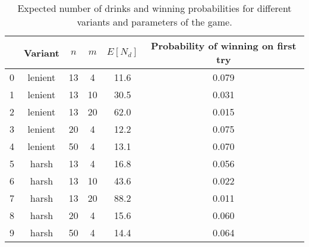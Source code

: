 \begin{table}[h]
\label{fig:ndtable}
\begin{center}
\begin{tabular}{@{}cccccc@{}}
\toprule
  & Variant         & $n$  & $m$  & $E[N_d]$          & Probability of winning on first try \\ \midrule
0 & lenient & 13 & 4  & 11.6& 0.079 \\
1 & lenient & 13 & 10 & 30.5& 0.031 \\
2 & lenient & 13 & 20 & 62.0& 0.015 \\
3 & lenient & 20 & 4  & 12.2& 0.075 \\
4 & lenient & 50 & 4  & 13.1& 0.070 \\
5 & harsh   & 13 & 4  & 16.8& 0.056 \\
6 & harsh   & 13 & 10 & 43.6& 0.022 \\
7 & harsh   & 13 & 20 & 88.2& 0.011 \\
8 & harsh   & 20 & 4  & 15.6& 0.060 \\
9 & harsh   & 50 & 4  & 14.4& 0.064 \\ \bottomrule
\end{tabular}
\caption{Expected number of drinks and winning probabilities for different variants and parameters of the game.}
\end{center}
\end{table}